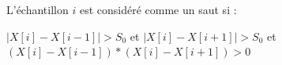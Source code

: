 L'\'echantillon $i$ est consid\'er\'e comme un saut si :


$|X[i] - X[i-1]| > S_0$ et $|X[i] - X[i+1]| > S_0$  et $ (X[i] - X[i - 1]) * (X[i] - X[i + 1]) > 0$
